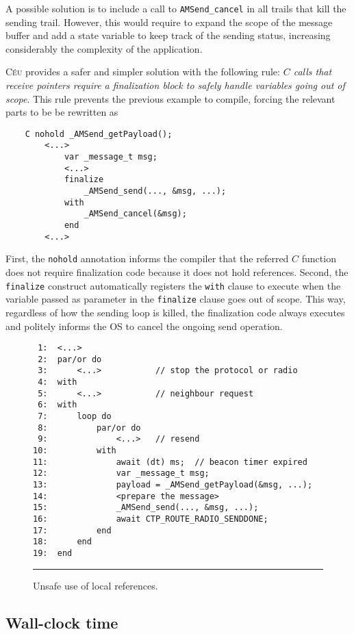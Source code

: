 \documentclass[10pt]{sensys-proc}
\newcommand{\CEU}{\textsc{C\'{e}u}\xspace}
\newcommand{\code}[1] {{\small{\texttt{#1}}}}
\begin{document}
A possible solution is to include a call to \code{AMSend\_cancel} in all trails 
that kill the sending trail.
However, this would require to expand the scope of the message buffer and add a 
state variable to keep track of the sending status, increasing considerably the 
complexity of the application.

\CEU provides a safer and simpler solution with the following rule:
\emph{$C$ calls that receive pointers require a finalization block to safely 
handle variables going out of scope}.
This rule prevents the previous example to compile, forcing the relevant parts 
to be be rewritten as

{\small
\begin{verbatim}
    C nohold _AMSend_getPayload();
        <...>
            var _message_t msg;
            <...>
            finalize
                _AMSend_send(..., &msg, ...);
            with
                _AMSend_cancel(&msg);
            end
        <...>
\end{verbatim}
}

First, the \code{nohold} annotation informs the compiler that the referred $C$ 
function does not require finalization code because it does not hold 
references.
Second, the \code{finalize} construct automatically registers the \code{with} 
clause to execute when the variable passed as parameter in the \code{finalize} 
clause goes out of scope.
This way, regardless of how the sending loop is killed, the finalization code 
always executes and politely informs the OS to cancel the ongoing send 
operation.

\begin{figure}[t]
{\small
\begin{verbatim}
 1:  <...>
 2:  par/or do
 3:      <...>           // stop the protocol or radio
 4:  with
 5:      <...>           // neighbour request
 6:  with
 7:      loop do
 8:          par/or do
 9:              <...>   // resend
10:          with
11:              await (dt) ms;  // beacon timer expired
12:              var _message_t msg;
13:              payload = _AMSend_getPayload(&msg, ...);
14:              <prepare the message>
15:              _AMSend_send(..., &msg, ...);
16:              await CTP_ROUTE_RADIO_SENDDONE;
17:          end
18:      end
19:  end
\end{verbatim}
}
\rule{8.5cm}{0.37pt}
\caption{ Unsafe use of local references.
\label{lst.local}
}
\end{figure}

\subsection{Wall-clock time}
\label{sec.ceu.time}
\end{document}
